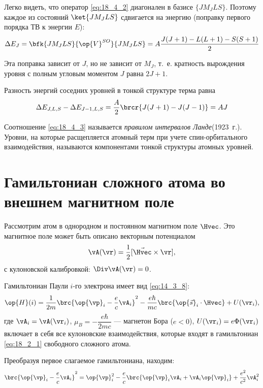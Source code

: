 Легко видеть, что оператор \eqref{eq:18_4_2} диагонален в базисе $\{ J M_J L S\}$. Поэтому каждое из состояний $\ket{J M_J L S}$ сдвигается на энергию (поправку первого порядка ТВ к энергии $E$):
$$
\Delta E_J = \bfk{J M_J L S}{\op{V}^{SO}}{J M_J L S} = A \frac{J(J+1) - L(L+1) - S(S+1)}{2}
$$

Эта поправка зависит от $J$, но не зависит от $M_J$, т.~е. кратность вырождения уровня с полным угловым моментом $J$ равна $2J+1$.

Разность энергий соседних уровней в тонкой структуре терма равна
\begin{equation}
\label{eq:18_4_3}
\Delta E_{J,L,S} - \Delta E_{J-1, L, S} = \frac{A}{2}\brcr{J(J+1) - J(J-1)} = AJ
\end{equation}

Соотношение \eqref{eq:18_4_3} называется {\em правилом интервалов Ланде}\footnotemark (1923~г.). Уровни, на которые расщепляется атомный терм при учете спин-орбитального взаимодействия, называются компонентами тонкой структуры атомных уровней.

\section{Гамильтониан сложного атома во внешнем магнитном поле}

Рассмотрим атом в однородном и постоянном магнитном поле $\Hvec$. Это магнитное поле может быть описано векторным потенциалом
$$
\vA(\vr) = \frac{1}{2}[\vec{\Hvec} \times \vr],
$$
с кулоновской калибровкой: $\Div \vA(\vr) = 0$.

Гамильтониан Паули $i$-го электрона имеет вид \eqref{eq:14_3_8}:
\begin{equation}
\label{eq:18_5_1}
\op{H}(i) = \frac{1}{2m}\brc{\op{\vp}_i - \frac{e}{c}\vA_i}^2 - \frac{e\hbar}{mc}\brc{\op{\vec{s}}_i \cdot \Hvec} + U(\vr_i),
\end{equation}
где $\vA_i = \vA(\vr_i)$, $\mu_B = -\dfrac{e\hbar}{2mc}$ --- магнетон Бора ($e < 0$), $U(\vr_i) = e\Phi(\vr_i)$ включает в себя все кулоновские взаимодействия, которые входят в гамильтониан \eqref{eq:18_2_1} свободного сложного атома.

Преобразуя первое слагаемое гамильтониана, находим:
\begin{gather*}
\brc{\op{\vp}_i - \frac{e}{c}\vA_i}^2 = \op{\vp}_i^2 - \frac{e}{c}\brc{\op{\vp}_i \vA_i + \vA_i \op{\vp}_i} + \frac{e^2}{c^2}\vA_i^2 
\end{gather*}

